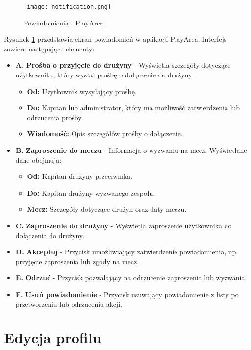 \documentclass[wmii,inf,inz]{uwmthesis} %
\begin{document}
\begin{figure}[H]
    \centering
    \texttt{[image: notification.png]}
    \caption{Powiadomienia - PlayArea}
    \label{fig:notifications}
\end{figure}

\noindent
Rysunek \ref{fig:notifications} przedstawia ekran powiadomień w aplikacji PlayArea. Interfejs zawiera następujące elementy:
\begin{itemize}
    \item \textbf{A. Prośba o przyjęcie do drużyny} - Wyświetla szczegóły dotyczące użytkownika, który wysłał prośbę o dołączenie do drużyny:
    \begin{itemize}[label=$\cdot$]
        \item \textbf{Od:} Użytkownik wysyłający prośbę.
        \item \textbf{Do:} Kapitan lub administrator, który ma możliwość zatwierdzenia lub odrzucenia prośby.
        \item \textbf{Wiadomość:} Opis szczegółów prośby o dołączenie.
    \end{itemize}
    \item \textbf{B. Zaproszenie do meczu} - Informacja o wyzwaniu na mecz. Wyświetlane dane obejmują:
    \begin{itemize}[label=$\cdot$]
        \item \textbf{Od:} Kapitan drużyny przeciwnika.
        \item \textbf{Do:} Kapitan drużyny wyzwanego zespołu.
        \item \textbf{Mecz:} Szczegóły dotyczące drużyn oraz daty meczu.
    \end{itemize}
    \item \textbf{C. Zaproszenie do drużyny} - Wyświetla zaproszenie użytkownika do dołączenia do drużyny.
    \item \textbf{D. Akceptuj} - Przycisk umożliwiający zatwierdzenie powiadomienia, np. przyjęcie zaproszenia lub zgody na mecz.
    \item \textbf{E. Odrzuć} - Przycisk pozwalający na odrzucenie zaproszenia lub wyzwania.
    \item \textbf{F. Usuń powiadomienie} - Przycisk usuwający powiadomienie z listy po przetworzeniu lub odrzuceniu akcji.
\end{itemize}
\section{Edycja profilu}
\end{document}
